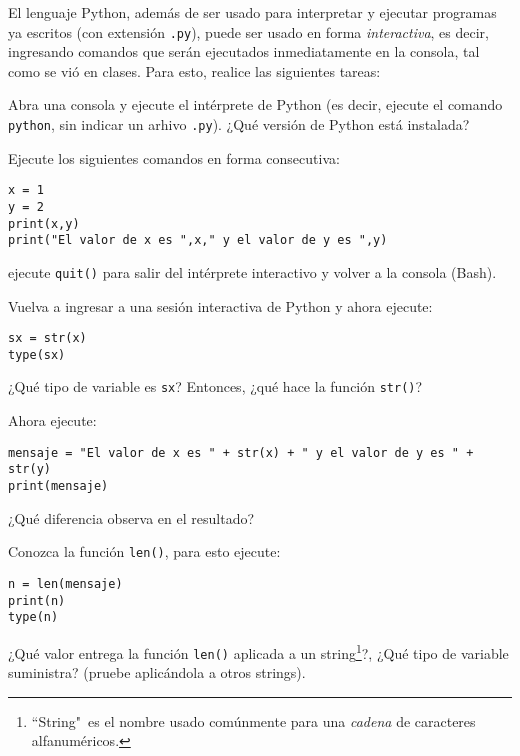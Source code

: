 \documentclass[11pt]{exam}
\begin{document}
\begin{questions}
\item  El lenguaje Python, además de ser usado para interpretar y ejecutar programas ya escritos (con extensión \texttt{.py}), puede ser usado en forma \textit{interactiva}, es decir, ingresando comandos que serán ejecutados inmediatamente en la consola, tal como se vió en clases. Para esto, realice las siguientes tareas:

\begin{parts}
\item Abra una consola y ejecute el intérprete de Python (es decir, ejecute el comando \texttt{python}, sin indicar un arhivo \texttt{.py}). ¿Qué versión de Python está instalada?
\item Ejecute los siguientes comandos en forma consecutiva:

\begin{verbatim}
x = 1
y = 2
print(x,y)
print("El valor de x es ",x," y el valor de y es ",y)
\end{verbatim}
\item ejecute \texttt{quit()} para salir del intérprete interactivo y volver a la consola (Bash).
\item Vuelva a ingresar a una sesión interactiva de Python y ahora ejecute:

\begin{verbatim}
sx = str(x)
type(sx)
\end{verbatim}

¿Qué tipo de variable es \texttt{sx}? Entonces, ¿qué hace la función \texttt{str()}?
\item Ahora ejecute:

\begin{verbatim}
mensaje = "El valor de x es " + str(x) + " y el valor de y es " + str(y)
print(mensaje)
\end{verbatim}

¿Qué diferencia observa en el resultado?
\item Conozca la función \texttt{len()}, para esto ejecute:

\begin{verbatim}
n = len(mensaje)
print(n)
type(n)
\end{verbatim}

¿Qué valor entrega la función \texttt{len()} aplicada a un string\footnote{``String"\, es el nombre usado comúnmente para una \textit{cadena} de caracteres alfanuméricos.}?, ¿Qué tipo de variable suministra? (pruebe aplicándola a otros strings).


\end{parts}
\end{questions}
\end{document}
